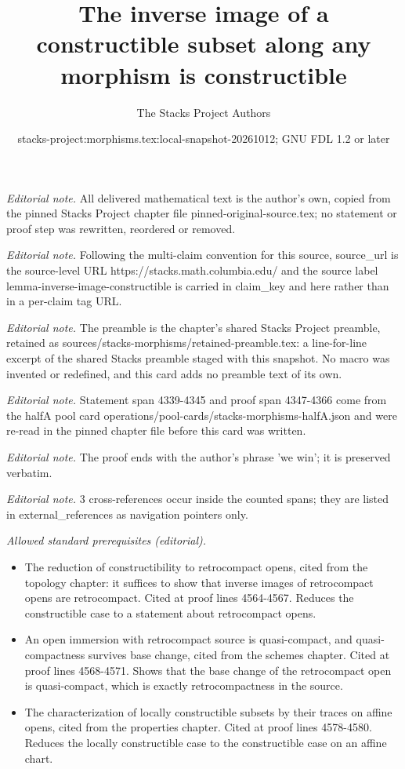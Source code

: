 \documentclass[10pt,a4paper]{amsart}
\title{The inverse image of a constructible subset along any morphism is constructible}
\author{The Stacks Project Authors}
\date{stacks-project:morphisms.tex:local-snapshot-20261012; GNU FDL 1.2 or later}
\theoremstyle{plain}
\theoremstyle{definition}
\theoremstyle{remark}
\numberwithin{equation}{subsection}
\begin{document}
\maketitle
\noindent\textit{Editorial note.} All delivered mathematical text is the author's own, copied from the pinned Stacks Project chapter file pinned-original-source.tex; no statement or proof step was rewritten, reordered or removed.\par\medskip
\noindent\textit{Editorial note.} Following the multi-claim convention for this source, source\_url is the source-level URL https://stacks.math.columbia.edu/ and the source label lemma-inverse-image-constructible is carried in claim\_key and here rather than in a per-claim tag URL.\par\medskip
\noindent\textit{Editorial note.} The preamble is the chapter's shared Stacks Project preamble, retained as sources/stacks-morphisms/retained-preamble.tex: a line-for-line excerpt of the shared Stacks preamble staged with this snapshot. No macro was invented or redefined, and this card adds no preamble text of its own.\par\medskip
\noindent\textit{Editorial note.} Statement span 4339-4345 and proof span 4347-4366 come from the halfA pool card operations/pool-cards/stacks-morphisms-halfA.json and were re-read in the pinned chapter file before this card was written.\par\medskip
\noindent\textit{Editorial note.} The proof ends with the author's phrase 'we win'; it is preserved verbatim.\par\medskip
\noindent\textit{Editorial note.} 3 cross-references occur inside the counted spans; they are listed in external\_references as navigation pointers only.\par\medskip
\noindent\textit{Allowed standard prerequisites (editorial).}\begin{itemize}
\item The reduction of constructibility to retrocompact opens, cited from the topology chapter: it suffices to show that inverse images of retrocompact opens are retrocompact. Cited at proof lines 4564-4567. Reduces the constructible case to a statement about retrocompact opens.
\item An open immersion with retrocompact source is quasi-compact, and quasi-compactness survives base change, cited from the schemes chapter. Cited at proof lines 4568-4571. Shows that the base change of the retrocompact open is quasi-compact, which is exactly retrocompactness in the source.
\item The characterization of locally constructible subsets by their traces on affine opens, cited from the properties chapter. Cited at proof lines 4578-4580. Reduces the locally constructible case to the constructible case on an affine chart.
\end{itemize}\medskip
\end{document}
